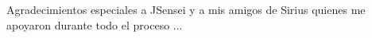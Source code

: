 \begin{dedication}

Agradecimientos especiales a JSensei y a mis amigos de Sirius quienes
me apoyaron durante todo el proceso ... 
\end{dedication}
